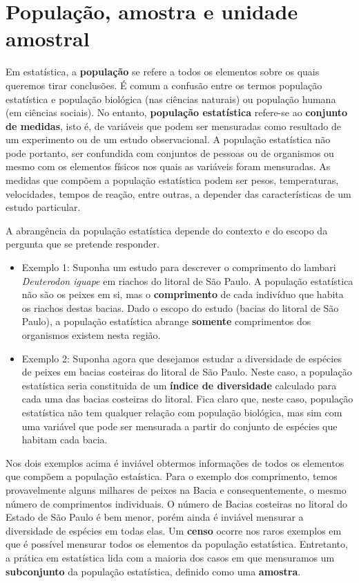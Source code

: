 \documentclass[
]{book}
\begin{document}
\hypertarget{populauxe7uxe3o-amostra-e-unidade-amostral}{%
\section{População, amostra e unidade amostral}\label{populauxe7uxe3o-amostra-e-unidade-amostral}}

Em estatística, a \textbf{população} se refere a todos os elementos sobre os quais queremos tirar conclusões. É comum a confusão entre os termos população estatística e população biológica (nas ciências naturais) ou população humana (em ciências sociais). No entanto, \textbf{população estatística} refere-se ao \textbf{conjunto de medidas}, isto é, de variáveis que podem ser mensuradas como resultado de um experimento ou de um estudo observacional. A população estatística não pode portanto, ser confundida com conjuntos de pessoas ou de organismos ou mesmo com os elementos físicos nos quais as variáveis foram mensuradas. As medidas que compõem a população estatística podem ser pesos, temperaturas, velocidades, tempos de reação, entre outras, a depender das características de um estudo particular.

A abrangência da população estatística depende do contexto e do escopo da pergunta que se pretende responder.

\begin{itemize}
\item
  Exemplo 1: Suponha um estudo para descrever o comprimento do lambari \emph{Deuterodon iguape} em riachos do litoral de São Paulo. A população estatística não são os peixes em si, mas o \textbf{comprimento} de cada indivíduo que habita os riachos destas bacias. Dado o escopo do estudo (bacias do litoral de São Paulo), a população estatística abrange \textbf{somente} comprimentos dos organismos existem nesta região.
\item
  Exemplo 2: Suponha agora que desejamos estudar a diversidade de espécies de peixes em bacias costeiras do litoral de São Paulo. Neste caso, a população estatística seria constituida de um \textbf{índice de diversidade} calculado para cada uma das bacias costeiras do litoral. Fica claro que, neste caso, população estatística não tem qualquer relação com população biológica, mas sim com uma variável que pode ser mensurada a partir do conjunto de espécies que habitam cada bacia.
\end{itemize}

Nos dois exemplos acima é inviável obtermos informações de todos os elementos que compõem a população estaística. Para o exemplo dos comprimento, temos provavelmente alguns milhares de peixes na Bacia e consequentemente, o mesmo número de comprimentos individuais. O número de Bacias costeiras no litoral do Estado de São Paulo é bem menor, porém ainda é inviável mensurar a diversidade de espécies em todas elas. Um \textbf{censo} ocorre nos raros exemplos em que é possível mensurar todos os elementos da população estatística. Entretanto, a prática em estatística lida com a maioria dos casos em que mensuramos um \textbf{subconjunto} da população estatística, definido como uma \textbf{amostra}.
\end{document}
